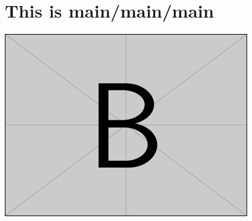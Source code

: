 \documentclass[../../main]{subfiles}
\begin{document}
\section*{This is main/main/main}


\includegraphics{image2.jpg}
\end{document}
